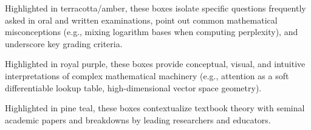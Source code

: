 \documentclass[../main.tex]{subfiles}
\begin{document}
\begin{examinsight}
Highlighted in terracotta/amber, these boxes isolate specific questions frequently asked in oral and written examinations, point out common mathematical misconceptions (e.g., mixing logarithm bases when computing perplexity), and underscore key grading criteria.
\end{examinsight}

\begin{intuition}
Highlighted in royal purple, these boxes provide conceptual, visual, and intuitive interpretations of complex mathematical machinery (e.g., attention as a soft differentiable lookup table, high-dimensional vector space geometry).
\end{intuition}

\begin{deepdive}
Highlighted in pine teal, these boxes contextualize textbook theory with seminal academic papers \citep{vaswani2017,brown2020,hoffmann2022} and breakdowns by leading researchers and educators.
\end{deepdive}
\end{document}
